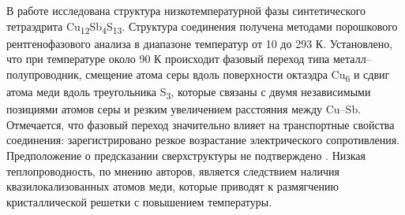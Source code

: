 В работе \cite{Nasonova2016} исследована структура низкотемпературной фазы синтетического тетраэдрита Cu\textsubscript{12}Sb\textsubscript{4}S\textsubscript{13}. Структура соединения получена методами порошкового рентгенофазового анализа в диапазоне температур от 10 до 293 К. Установлено, что при температуре около 90 К происходит фазовый переход типа металл--полупроводник,  смещение атома серы вдоль поверхности октаэдра Cu\textsubscript{6} и сдвиг атома меди вдоль треугольника S\textsubscript{3}, которые связаны с двумя независимыми позициями атомов серы и резким увеличением расстояния между Cu--Sb. Отмечается, что фазовый переход значительно влияет на транспортные свойства соединения: зарегистрировано резкое возрастание электрического сопротивления. Предположение о предсказании сверхструктуры не подтверждено \cite{Tanaka2015}.
Низкая теплопроводность, по мнению авторов, является следствием наличия квазилокализованных атомов меди, которые приводят к размягчению кристаллической решетки с повышением температуры.
